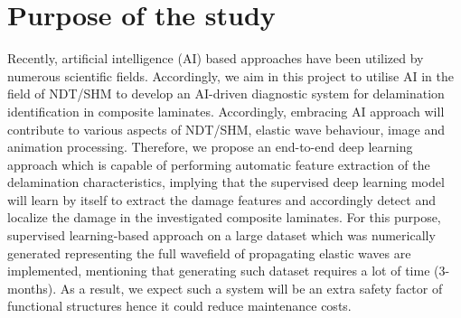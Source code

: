 \section{Purpose of the study}
\label{sec13}
Recently, artificial intelligence (AI) based approaches have been utilized by numerous scientific fields. 
Accordingly, we aim in this project to utilise AI in the field of NDT/SHM to develop an AI-driven diagnostic system for delamination identification in composite laminates. 
Accordingly, embracing AI approach will contribute to various aspects of NDT/SHM, elastic wave behaviour, image and animation processing.
Therefore, we propose an end-to-end deep learning approach which is capable of performing automatic feature extraction of the delamination characteristics, implying that the supervised deep learning model will learn by itself to extract the damage features and accordingly detect and localize the damage in
the investigated composite laminates.
For this purpose, supervised learning-based approach on a large dataset which was numerically generated representing the full wavefield of propagating elastic waves are implemented, mentioning that generating such dataset requires a lot of time (3-months). 
As a result, we expect such a system will be an extra safety factor of functional structures hence it could reduce
maintenance costs.
